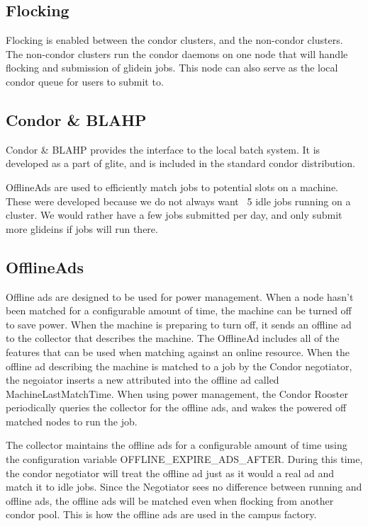 \documentclass[11pt]{article}
\begin{document}
\subsection{Flocking}
Flocking is enabled between the condor clusters, and the non-condor clusters.  The non-condor clusters run the condor daemons on one node that will handle flocking and submission of glidein jobs.  This node can also serve as the local condor queue for users to submit to. 

\subsection{Condor \& BLAHP}
\label{sec:condorandblahp}
Condor \& BLAHP provides the interface to the local batch system.  It is developed as a part of glite, and is included in the standard condor distribution. 

OfflineAds are used to efficiently match jobs to potential slots on a machine.  These were developed because we do not always want ~5 idle jobs running on a cluster.  We would rather have a few jobs submitted per day, and only submit more glideins if jobs will run there.


\subsection{OfflineAds}
Offline ads are designed to be used for power management. When a node hasn't been matched for a configurable amount of time, the machine can be turned off to save power. When the machine is preparing to turn off, it sends an offline ad to the collector that describes the machine. The OfflineAd includes all of the features that can be used when matching against an online resource.  When the offline ad describing the machine is matched to a job by the Condor negotiator, the negoiator inserts a new attributed into the offline ad called MachineLastMatchTime.  When using power management, the Condor Rooster periodically queries the collector for the offline ads, and wakes the powered off matched nodes to run the job.

The collector maintains the offline ads for a configurable amount of time using the configuration variable OFFLINE\_EXPIRE\_ADS\_AFTER. During this time, the condor negotiator will treat the offline ad just as it would a real ad and match it to idle jobs. Since the Negotiator sees no difference between running and offline ads, the offline ads will be matched even when flocking from another condor pool.  This is how the offline ads are used in the campus factory.
\end{document}
